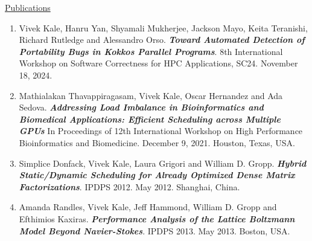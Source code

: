 




\underline{Publications}
\begin{enumerate}
\item Vivek Kale, Hanru Yan, Shyamali Mukherjee, Jackson Mayo, Keita Teranishi, Richard Rutledge and Alessandro Orso. \textbf{\it Toward Automated Detection of Portability Bugs in Kokkos Parallel Programs}. 8th International Workshop on Software Correctness for HPC Applications, SC24. November 18, 2024. 

\item Mathialakan Thavappiragasam, Vivek Kale, Oscar Hernandez and Ada Sedova. \textbf{\textit{Addressing Load Imbalance in Bioinformatics and Biomedical Applications: Efficient Scheduling across Multiple GPUs}} In Proceedings of 12th International Workshop on High Performance Bioinformatics and Biomedicine. December 9, 2021. Houston, Texas, USA. 

\item Simplice Donfack, Vivek Kale, Laura Grigori and William D. Gropp. \textbf{\textit{Hybrid Static/Dynamic Scheduling for Already Optimized Dense Matrix Factorizations}}. IPDPS 2012. May 2012. Shanghai, China.
\item Amanda Randles, Vivek Kale, Jeff Hammond, William D. Gropp and Efthimios Kaxiras. \textbf{\textit{Performance Analysis of the Lattice Boltzmann Model Beyond Navier-Stokes}}. IPDPS 2013. May 2013. Boston, USA.



\end{enumerate} 
